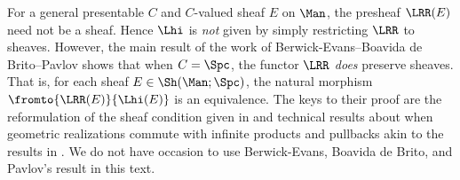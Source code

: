 \begin{remark}\label{remark:BE-BdB-P}
	For a general presentable \category $ C $ and $ C $-valued sheaf $ E $ on $ \Man $, the presheaf $ \LRR(E) $ need not be a sheaf.
	Hence $ \Lhi $ is \textit{not} given by simply restricting $ \LRR $ to sheaves.
	However, the main result of the work of Berwick-Evans--Boavida de Brito--Pavlov \cite{BEBdBP:Classifying} shows that when $ C = \Spc $, the functor $ \LRR $ \textit{does} preserve sheaves.
	That is, for each sheaf $ E \in \Sh(\Man;\Spc) $, the natural morphism $ \fromto{\LRR(E)}{\Lhi(E)} $ is an equivalence.
	The keys to their proof are the reformulation of the sheaf condition given in  and technical results about when geometric realizations commute with infinite products and pullbacks akin to the results in \cite[]{SAG}.
	We do not have occasion to use Berwick-Evans, Boavida de Brito, and Pavlov's result in this text.
\end{remark}

